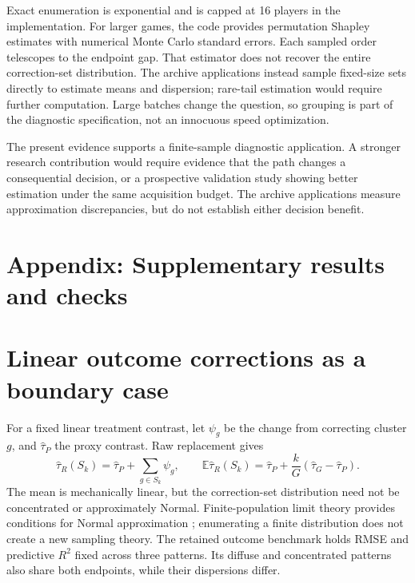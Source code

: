 \documentclass[11pt]{article}
\newcommand{\E}{\mathbb{E}}
\begin{document}
Exact enumeration is exponential and is capped at 16 players in the implementation.
For larger games, the code provides permutation Shapley estimates with numerical
Monte Carlo standard errors. Each sampled order telescopes to the endpoint gap.
That estimator does not recover the entire correction-set distribution. The
archive applications instead sample fixed-size sets directly to estimate means
and dispersion; rare-tail estimation would require further computation. Large batches change
the question, so grouping is part of the diagnostic specification, not an
innocuous speed optimization.

The present evidence supports a finite-sample diagnostic application. A stronger
research contribution would require evidence that the path changes a
consequential decision, or a prospective validation study showing better
estimation under the same acquisition budget. The archive applications measure
approximation discrepancies, but do not establish either decision benefit.




\clearpage
\appendix
\setcounter{table}{0}
\renewcommand{\thetable}{A\arabic{table}}
\renewcommand{\theHtable}{appendix.\arabic{table}}
\setcounter{figure}{0}
\renewcommand{\thefigure}{A\arabic{figure}}
\renewcommand{\theHfigure}{appendix.\arabic{figure}}
\setcounter{equation}{0}
\renewcommand{\theequation}{A\arabic{equation}}
\renewcommand{\theHequation}{appendix.\arabic{equation}}
\section*{Appendix: Supplementary results and checks}
\section{Linear outcome corrections as a boundary case}

For a fixed linear treatment contrast, let $\psi_g$ be the change from correcting
cluster $g$, and $\widehat\tau_P$ the proxy contrast. Raw replacement gives
\begin{equation}
 \widehat\tau_R(S_k)=\widehat\tau_P+\sum_{g\in S_k}\psi_g,\qquad
 \E\widehat\tau_R(S_k)=\widehat\tau_P+
 \frac{k}{G}(\widehat\tau_G-\widehat\tau_P).
\end{equation}
The mean is mechanically linear, but the correction-set distribution need not be
concentrated or approximately Normal. Finite-population limit theory provides
conditions for Normal approximation \citep{erdos1959,hajek1960,liding2017};
enumerating a finite distribution does not create a new sampling theory.
The retained outcome benchmark holds RMSE
and predictive $R^2$ fixed across three patterns. Its diffuse and concentrated
patterns also share both endpoints, while their dispersions differ.
\end{document}
